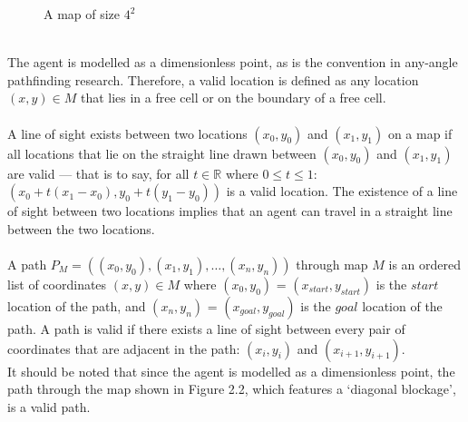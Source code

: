 \documentclass[12pt,notitlepage]{report}
\begin{document}
\begin{figure}
\centering
  \caption{A map of size $4^{2}$}
\end{figure}

\\
The agent is modelled as a dimensionless point, as is the convention\cite{Daniel10} in any-angle pathfinding research. Therefore, a valid location is defined as any location $(x,y) \in M$ that lies in a free cell or on the boundary of a free cell.\\

\\
A line of sight exists between two locations $(x_{0},y_{0})$ and $(x_{1},y_{1})$ on a map if all locations that lie on the straight line drawn between $(x_{0},y_{0})$ and $(x_{1},y_{1})$ are valid --- that is to say, for all $t \in \mathbb{R}$ where $0 \leq t \leq 1$: $(x_{0} + t(x_{1}-x_{0}),y_{0} + t(y_{1}-y_{0}))$ is a valid location. The existence of a line of sight between two locations implies that an agent can travel in a straight line between the two locations.\\

\\
A path  $P_{M} = ((x_{0},y_{0}), (x_{1},y_{1}), \ldots, (x_{n},y_{n}))$ through map $M$ is an ordered list of coordinates $(x,y) \in M$ where $(x_{0},y_{0})$ = $(x_{start},y_{start})$ is the $start$ location of the path, and $(x_{n},y_{n})$ = $(x_{goal},y_{goal})$ is the $goal$ location of the path. A path is valid if there exists a line of sight between every pair of coordinates that are adjacent in the path: $(x_{i},y_{i})$ and $(x_{i+1},y_{i+1})$.\\

\noindent
It should be noted that since the agent is modelled as a dimensionless point, the path through the map shown in Figure 2.2, which features a `diagonal blockage', is a valid path.\\
\end{document}
